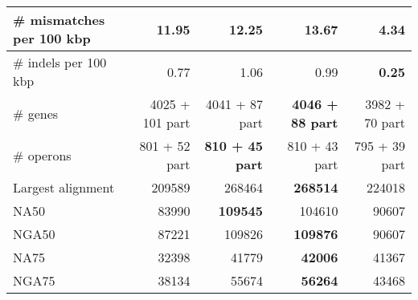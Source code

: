 \documentclass[12pt,a4paper]{article}
\begin{document}
\begin{table}[ht]
\begin{center}
\begin{tabular}{|l*{4}{|r}|}
\# mismatches per 100 kbp & 11.95 & 12.25 & 13.67 & {\bf 4.34} \\ \hline
\# indels per 100 kbp & 0.77 & 1.06 & 0.99 & {\bf 0.25} \\ \hline
\# genes & 4025 + 101 part & 4041 + 87 part & {\bf 4046 + 88 part} & 3982 + 70 part \\ \hline
\# operons & 801 + 52 part & {\bf 810 + 45 part} & 810 + 43 part & 795 + 39 part \\ \hline
Largest alignment & 209589 & 268464 & {\bf 268514} & 224018 \\ \hline
NA50 & 83990 & {\bf 109545} & 104610 & 90607 \\ \hline
NGA50 & 87221 & 109826 & {\bf 109876} & 90607 \\ \hline
NA75 & 32398 & 41779 & {\bf 42006} & 41367 \\ \hline
NGA75 & 38134 & 55674 & {\bf 56264} & 43468 \\ \hline
\end{tabular}
\end{center}
\end{table}
\end{document}
